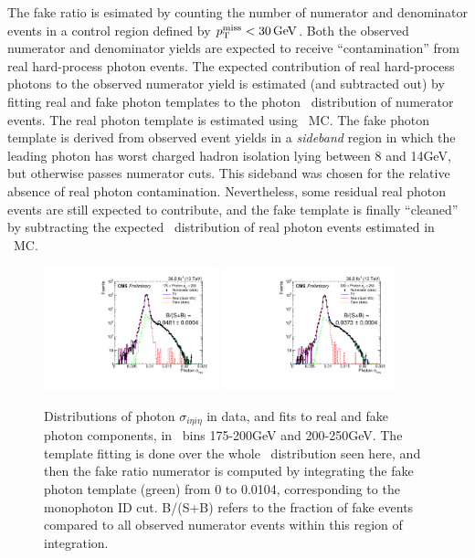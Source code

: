 The fake ratio is esimated by counting the number of numerator and denominator events in a control region defined by $\MET < 30\unit{GeV}$. Both the observed
numerator and denominator yields are expected to receive ``contamination'' from real hard-process photon events. The expected contribution of real hard-process
photons to the observed numerator yield is estimated (and subtracted out) by fitting real and fake photon templates to the photon \sieie\ distribution of numerator
events. The real photon template is estimated using \gjets\ MC. The fake photon template is derived from observed event yields in a \textit{sideband} region in which
the leading photon has worst charged hadron isolation lying between 8 and 14\unit{GeV}, but otherwise passes numerator cuts.
This sideband was chosen for the relative absence of real photon contamination. Nevertheless, some residual real photon events are still expected to contribute, and
the fake template is finally ``cleaned'' by subtracting the expected \sieie\ distribution of real photon events estimated in \gjets\ MC.

\begin{figure}[hbtp]
  \begin{center}
  \includegraphics[width=0.45\textwidth]{Figures/QCD/num_fit_175to200.pdf}
  \includegraphics[width=0.45\textwidth]{Figures/QCD/num_fit_200to250.pdf}
  \caption{Distributions of photon $\sigma_{i\eta i\eta}$ in data, and fits to real and fake photon components, in \ETgamma\ bins 175-200\unit{GeV} and 200-250\unit{GeV}.
  The template fitting is done over the whole \sieie\ distribution seen here, and then the fake ratio numerator is computed by integrating the fake photon template (green)
  from 0 to 0.0104, corresponding to the monophoton ID cut. B/(S+B) refers to the fraction of fake events compared to all observed numerator events within this region of integration.}
  \label{fig:qcd_fits_a}
  \end{center}
\end{figure}


